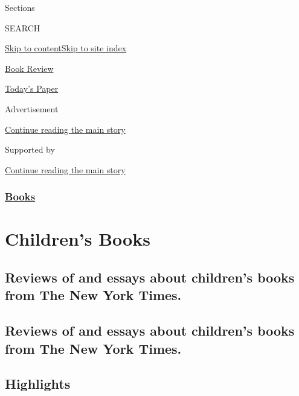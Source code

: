 Sections

SEARCH

\protect\hyperlink{site-content}{Skip to
content}\protect\hyperlink{site-index}{Skip to site index}

\href{https://www.nytimes3xbfgragh.onion/section/books/review}{Book
Review}

\href{https://myaccount.nytimes3xbfgragh.onion/auth/login?response_type=cookie\&client_id=vi}{}

\href{https://www.nytimes3xbfgragh.onion/section/todayspaper}{Today's
Paper}

Advertisement

\protect\hyperlink{after-top}{Continue reading the main story}

Supported by

\protect\hyperlink{after-sponsor}{Continue reading the main story}

\hypertarget{books}{%
\subsubsection{\texorpdfstring{\href{/section/books}{Books}}{Books}}\label{books}}

\hypertarget{childrens-books}{%
\section{Children's Books}\label{childrens-books}}

\hypertarget{reviews-of-and-essays-about-childrens-books-from-the-new-york-times}{%
\subsection{Reviews of and essays about children's books from The New
York
Times.}\label{reviews-of-and-essays-about-childrens-books-from-the-new-york-times}}

\hypertarget{reviews-of-and-essays-about-childrens-books-from-the-new-york-times-1}{%
\subsection{Reviews of and essays about children's books from The New
York
Times.}\label{reviews-of-and-essays-about-childrens-books-from-the-new-york-times-1}}

\hypertarget{highlights}{%
\subsection{Highlights}\label{highlights}}

